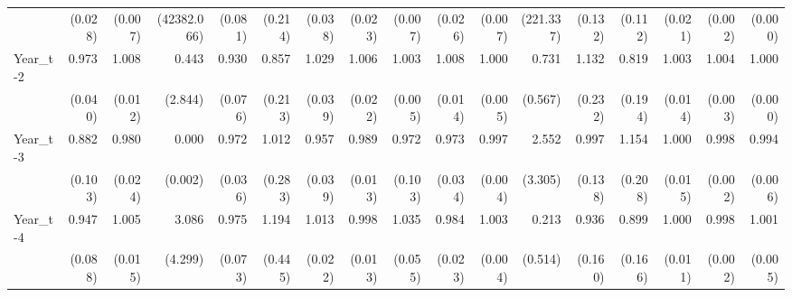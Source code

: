 \begin{table}[htbp]
\begin{tabular}{l*{16}{D{.}{.}{-1}}}
                    &     (0.028)         &     (0.007)         & (42382.066)         &     (0.081)         &     (0.214)         &     (0.038)         &     (0.023)         &     (0.007)         &     (0.026)         &     (0.007)         &   (221.337)         &     (0.132)         &     (0.112)         &     (0.021)         &     (0.002)         &     (0.000)         \\
Year\_t-2            &       0.973         &       1.008         &       0.443         &       0.930         &       0.857         &       1.029         &       1.006         &       1.003         &       1.008         &       1.000         &       0.731         &       1.132         &       0.819         &       1.003         &       1.004         &       1.000         \\
                    &     (0.040)         &     (0.012)         &     (2.844)         &     (0.076)         &     (0.213)         &     (0.039)         &     (0.022)         &     (0.005)         &     (0.014)         &     (0.005)         &     (0.567)         &     (0.232)         &     (0.194)         &     (0.014)         &     (0.003)         &     (0.000)         \\
Year\_t-3            &       0.882         &       0.980         &       0.000         &       0.972         &       1.012         &       0.957         &       0.989         &       0.972         &       0.973         &       0.997         &       2.552         &       0.997         &       1.154         &       1.000         &       0.998         &       0.994         \\
                    &     (0.103)         &     (0.024)         &     (0.002)         &     (0.036)         &     (0.283)         &     (0.039)         &     (0.013)         &     (0.103)         &     (0.034)         &     (0.004)         &     (3.305)         &     (0.138)         &     (0.208)         &     (0.015)         &     (0.002)         &     (0.006)         \\
Year\_t-4            &       0.947         &       1.005         &       3.086         &       0.975         &       1.194         &       1.013         &       0.998         &       1.035         &       0.984         &       1.003         &       0.213         &       0.936         &       0.899         &       1.000         &       0.998         &       1.001         \\
                    &     (0.088)         &     (0.015)         &     (4.299)         &     (0.073)         &     (0.445)         &     (0.022)         &     (0.013)         &     (0.055)         &     (0.023)         &     (0.004)         &     (0.514)         &     (0.160)         &     (0.166)         &     (0.011)         &     (0.002)         &     (0.005)         \\

\end{tabular}
\end{table}
